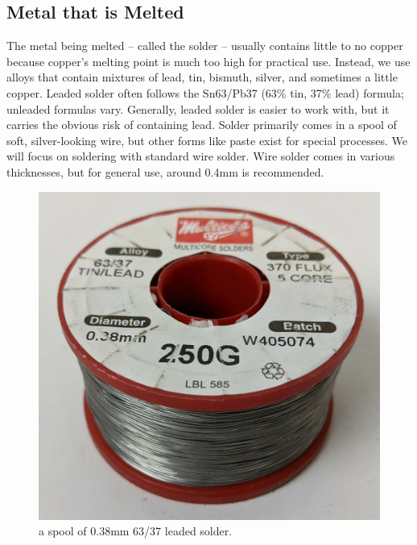 \subsection{Metal that is Melted}
The metal being melted – called the solder – usually contains little to no copper because copper’s melting point is much too high for practical use. Instead, we use alloys that contain mixtures of lead, tin, bismuth, silver, and sometimes a little copper. Leaded solder often follows the Sn63/Pb37 (63\% tin, 37\% lead) formula; unleaded formulas vary. Generally, leaded solder is easier to work with, but it carries the obvious risk of containing lead. Solder primarily comes in a spool of soft, silver-looking wire, but other forms like paste exist for special processes. We will focus on soldering with standard wire solder. Wire solder comes in various thicknesses, but for general use, around 0.4mm is recommended.
\begin{figure}[h]
    \caption{a spool of 0.38mm 63/37 leaded solder.}
    \centering \includegraphics[scale=0.25]{images/solder_spool.jpg}
\end{figure}

\pagebreak

